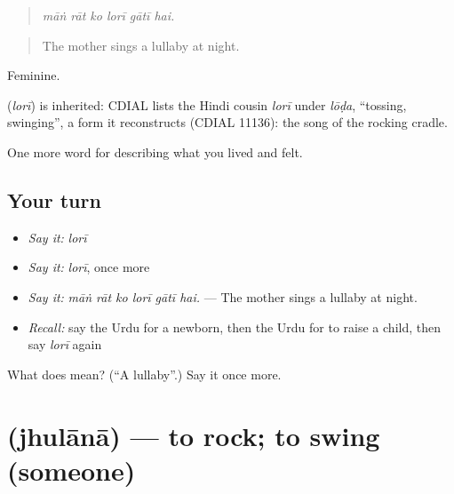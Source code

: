 \begin{quote}
     
\end{quote}

\begin{quote}
\emph{māṅ rāt ko lorī gātī hai.}
\end{quote}

\begin{quote}
The mother sings a lullaby at night.
\end{quote}

Feminine.

\begin{cousinweb}
\textbf{} (\emph{lorī}) is inherited: CDIAL lists the Hindi cousin \emph{lorī} under \emph{lōḍa}, \textquotedblleft{}tossing, swinging\textquotedblright{}, a form it reconstructs (CDIAL 11136): the song of the rocking cradle.
\end{cousinweb}

\begin{grammarlens}[title={What you've built}]
One more word for describing what you lived and felt.
\end{grammarlens}

\subsection*{Your turn}
\begin{itemize}
\raggedright
  \item \emph{Say it:} \emph{lorī}
  \item \emph{Say it:} \emph{lorī}, once more
  \item \emph{Say it:} \emph{māṅ rāt ko lorī gātī hai.} — The mother sings a lullaby at night.
  \item \emph{Recall:} say the Urdu for a newborn, then the Urdu for to raise a child, then say \emph{lorī} again
\end{itemize}

\begin{tcolorbox}[breakable,colback=teal!4,colframe=teal!35!black,title={Before you move on}]
What does  mean? (\textquotedblleft{}A lullaby\textquotedblright{}.) Say it once more.
\end{tcolorbox}
\section[\texorpdfstring{\ur{جھلانا} (jhulānā)}{جھلانا (jhulānā)}]{ (jhulānā) — to rock; to swing (someone)}

